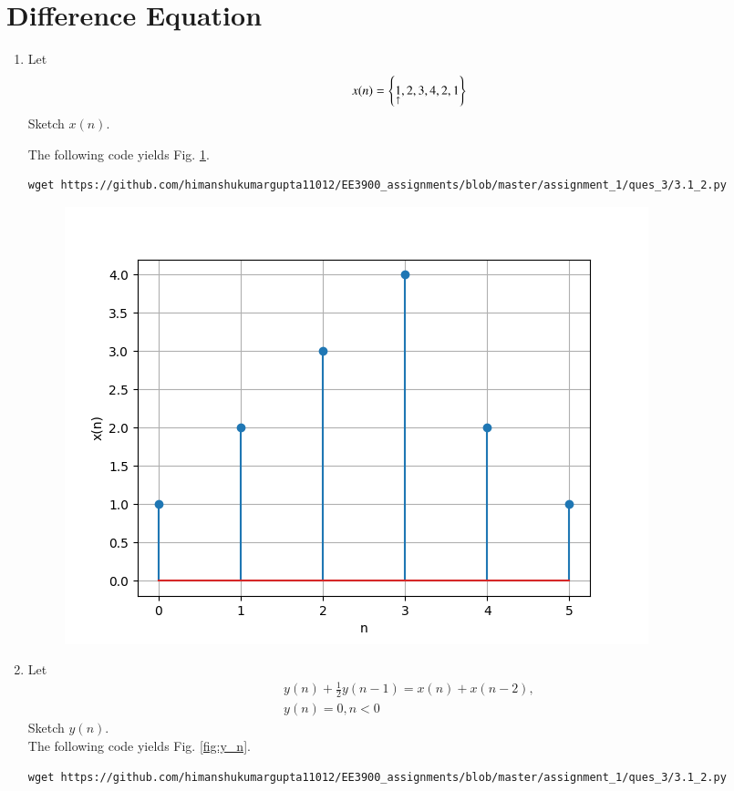 \documentclass[journal,12pt,twocolumn]{IEEEtran}
\renewcommand\thesection{\arabic{section}}
\begin{document}
\section{Difference Equation}
\begin{enumerate}[label=\thesection.\arabic*,ref=\thesection.\theenumi]
\item Let
\label{def:x_n}
\begin{equation}
x(n) = \left\{\underset{\uparrow}{1},2,3,4,2,1\right\}
\end{equation}
Sketch $x(n)$.

\solution The following code yields Fig. \ref{fig:x_n}.
\begin{lstlisting}
wget https://github.com/himanshukumargupta11012/EE3900_assignments/blob/master/assignment_1/ques_3/3.1_2.py
\end{lstlisting}
\begin{figure}[!ht]
	\begin{center}
		\includegraphics[width=\columnwidth]{./ques_3/x_n.png}
	\end{center}
	\label{fig:x_n}	
\end{figure}
\item Let
\begin{multline}
\label{eq:iir_filter}
y(n) + \frac{1}{2}y(n-1) = x(n) + x(n-2), 
\\
 y(n) = 0, n < 0
\end{multline}
Sketch $y(n)$.
\\
\solution The following code yields Fig. \ref{fig:y_n}.
\begin{lstlisting}
wget https://github.com/himanshukumargupta11012/EE3900_assignments/blob/master/assignment_1/ques_3/3.1_2.py

\end{lstlisting}
\end{enumerate}
\end{document}
